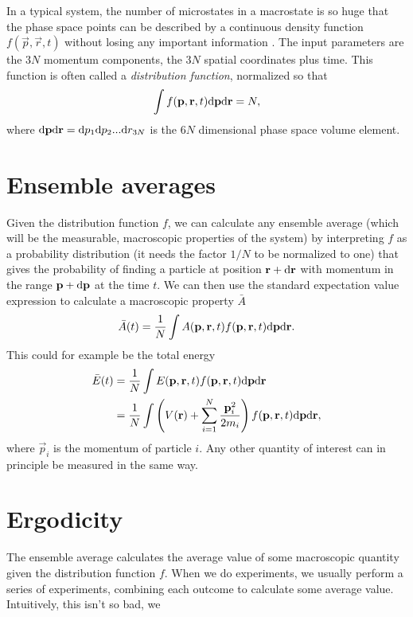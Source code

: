 In a typical system, the number of microstates in a macrostate is so huge that the phase space points can be described by a continuous density function $f(\vec p, \vec r, t)$ without losing any important information \cite{mcquarrie1973statistical}. The input parameters are the $3N$ momentum components, the $3N$ spatial coordinates plus time. This function is often called a \textit{distribution function}, normalized so that
\begin{align}
	\int f(\mathbf p, \mathbf r, t) \mathrm{d}\mathbf p\mathrm{d}\mathbf r = N,
\end{align}
where $\mathrm{d}\mathbf p\mathrm{d}\mathbf r=\mathrm{d}p_1\mathrm{d}p_2...\mathrm{d}r_{3N}$ is the $6N$ dimensional phase space volume element. 

\section{Ensemble averages}
\label{sec:kinetic_theory_ensemble_averages}
Given the distribution function $f$, we can calculate any ensemble average (which will be the measurable, macroscopic properties of the system) by interpreting $f$ as a probability distribution (it needs the factor $1/N$ to be normalized to one) that gives the probability of finding a particle at position $\mathbf r + \mathrm{d}\mathbf r$ with momentum in the range $\mathbf p + \mathrm{d}\mathbf p$ at the time $t$. We can then use the standard expectation value expression to calculate a macroscopic property $\bar A$
\begin{align}
	\bar A(t) = \frac{1}{ N}\int A(\mathbf p, \mathbf r, t)f(\mathbf p, \mathbf r, t)\mathrm{d}\mathbf p\mathrm{d}\mathbf r.
\end{align}
This could for example be the total energy
\begin{align}
	\bar E(t) &= \frac{1}{ N}\int E(\mathbf p, \mathbf r, t)f(\mathbf p, \mathbf r, t)\mathrm{d}\mathbf p\mathrm{d}\mathbf r \\
	&= \frac{1}{ N}\int \left(V(\mathbf r) + \sum_{i=1}^N \frac{\mathbf p_i^2}{2m_i} \right)f(\mathbf p, \mathbf r, t)\mathrm{d}\mathbf p \mathrm{d}\mathbf r,
\end{align}
where $\vec p_i$ is the momentum of particle $i$. Any other quantity of interest can in principle be measured in the same way. 
\section{Ergodicity}
\label{sec:kinetic_theory_ergodicity}
The ensemble average calculates the average value of some macroscopic quantity given the distribution function $f$. When we do experiments, we usually perform a series of experiments, combining each outcome to calculate some average value. Intuitively, this isn't so bad, we 